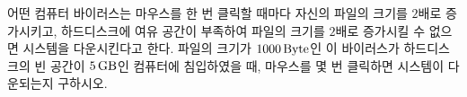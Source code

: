 어떤 컴퓨터 바이러스는 마우스를 한 번 클릭할 때마다 자신의 파일의 크기를 $2$배로 증가시키고, 하드디스크에 여유 공간이 부족하여 파일의 크기를 $2$배로 증가시킬 수 없으면 시스템을 다운시킨다고 한다. 파일의 크기가 $1000\mkern3mu \mathrm{Byte}$인 이 바이러스가 하드디스크의 빈 공간이 $5\mkern3mu \mathrm{GB}$인 컴퓨터에 침입하였을 때, 마우스를 몇 번 클릭하면 시스템이 다운되는지 구하시오. 
